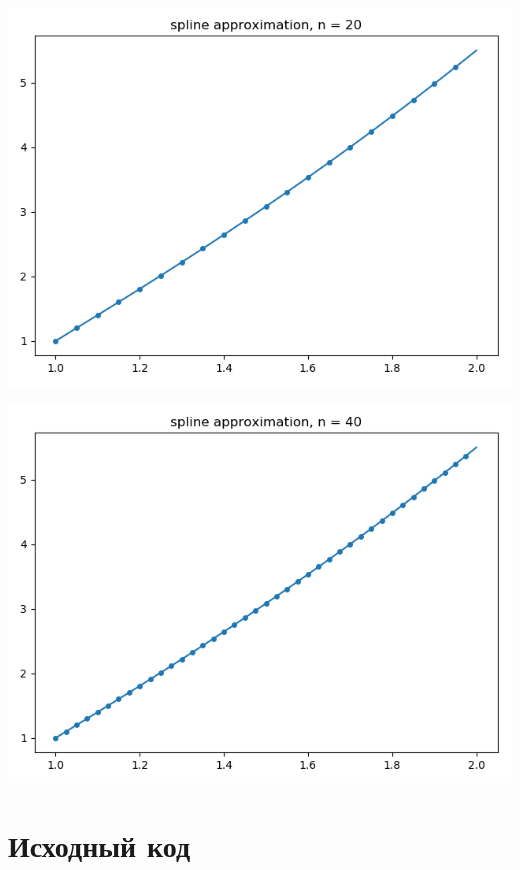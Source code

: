 \documentclass{article}
\begin{document}
\includegraphics[scale=0.5]{20.png}

\includegraphics[scale=0.5]{40.png}

\section{Исходный код}
\end{document}
